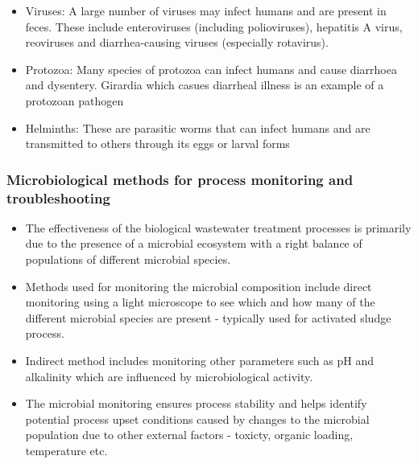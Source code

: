 \begin{itemize}
\begin{itemize}
					\item Viruses: A large number of viruses may infect humans and are present in feces.  These include enteroviruses (including polioviruses), hepatitis A virus, reoviruses and diarrhea-causing viruses (especially rotavirus).
					      
					\item Protozoa:  Many species of protozoa can infect humans and cause diarrhoea and dysentery. Girardia which casues diarrheal illness is an example of a protozoan pathogen
					      
					\item Helminths:  These are parasitic worms that can infect humans and are transmitted to others through its eggs or larval forms
					      
				\end{itemize}
											\end{itemize}
				\subsubsection{Microbiological methods for process monitoring and troubleshooting}
				\begin{itemize}
					\item The effectiveness of the biological wastewater treatment processes is primarily due to the presence of a microbial ecosystem with a right balance of populations of different microbial species.
					\item Methods used for monitoring the microbial composition include direct monitoring using a light microscope to see which and how many of the different microbial species are present - typically used for activated sludge process.
					\item Indirect method includes monitoring other parameters such as pH and alkalinity which are influenced by microbiological activity.
					\item The microbial monitoring ensures process stability and helps identify potential process upset conditions caused by changes to the microbial population due to other external factors - toxicty, organic loading, temperature etc.
					

				\end{itemize}

